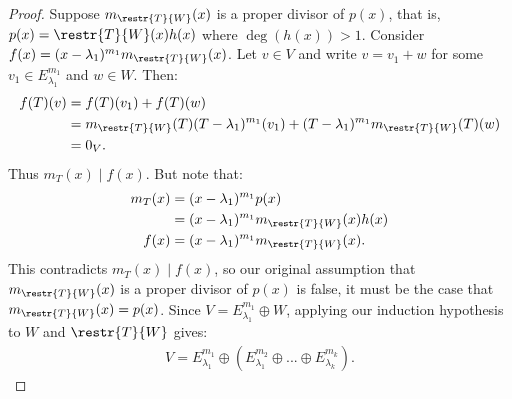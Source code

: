 \begin{proof}
            Suppose $m_\restr{T}{W}(x)$ is a proper divisor of $p(x)$, that is, $p(x) = \restr{T}{W}(x)h(x)$ where $\deg(h(x)) > 1$. Consider $f(x) = (x-\lambda_1)^{m_1}m_\restr{T}{W}(x)$. Let $v \in V$ and write $v = v_1 + w$ for some $v_1 \in E_{\lambda_1}^{m_1}$ and $w \in W$. Then:
                \begin{equation*}
                \begin{split}
                    f(T)(v)
                    & = f(T)(v_1) + f(T)(w) \\
                    & = m_\restr{T}{W}(T)(T-\lambda_1)^{m_1}(v_1) + (T-\lambda_1)^{m_1}m_\restr{T}{W}(T)(w) \\
                    & = 0_V.
                \end{split}
                \end{equation*}
            Thus $m_T(x) \mid f(x)$. But note that:
                \begin{equation*}
                \begin{split}
                    m_T(x) &= (x-\lambda_1)^{m_1}p(x)\\
                     & = (x-\lambda_1)^{m_1} m_\restr{T}{W}(x)h(x)\\
                     f(x) & = (x-\lambda_1)^{m_1}m_\restr{T}{W}(x).
                \end{split}
                \end{equation*}
            This contradicts $m_T(x) \mid f(x)$, so our original assumption that $m_\restr{T}{W}(x)$ is a proper divisor of $p(x)$ is false, it must be the case that $m_\restr{T}{W}(x) = p(x)$. Since $V = E_{\lambda_1}^{m_1} \oplus W$, applying our induction hypothesis to $W$ and $\restr{T}{W}$ gives:
                \begin{equation*}
                \begin{split}
                    V = E_{\lambda_1}^{m_1} \oplus \left(E_{\lambda_1}^{m_2} \oplus ... \oplus E_{\lambda_k}^{m_k}\right).
                \end{split}
                \end{equation*}
        \end{proof}

